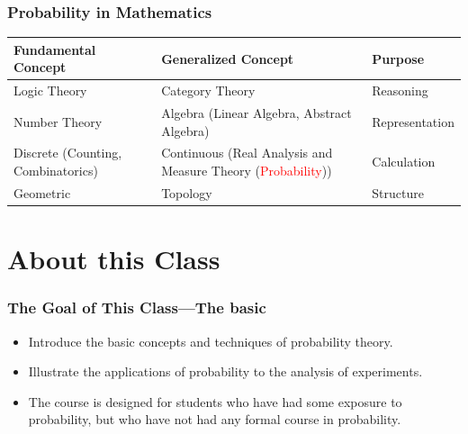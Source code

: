\documentclass[11pt]{RU}
\theoremstyle{definition}
\theoremstyle{remark}
\begin{document}

\begin{frame}
\frametitle{Probability in Mathematics}
\begin{table}[]
    \centering
    \begin{tabularx}{\textwidth}{|X|X|l|}
    \hline
    Fundamental Concept & Generalized Concept & Purpose               \\ \hline \hline
    Logic Theory        & Category Theory     & Reasoning \\ \hline
    Number Theory            & Algebra (Linear Algebra, Abstract Algebra) &   Representation \\ \hline
    Discrete (Counting, Combinatorics) & Continuous (Real Analysis and Measure Theory (\textcolor{red}{Probability}))     &  Calculation     \\ \hline
    Geometric           & Topology            &  Structure \\ \hline
    \end{tabularx}
\end{table}
\end{frame}

\section{About this Class}
\begin{frame}
\frametitle{The Goal of This Class---The basic}
\begin{itemize}
    \item Introduce the basic concepts and techniques of probability theory.
    \item Illustrate the applications of probability to the analysis of experiments.
    \item The course is designed for students who have had some exposure to probability, but who have not had any formal course in probability.
\end{itemize}
\end{frame}
\end{document}
